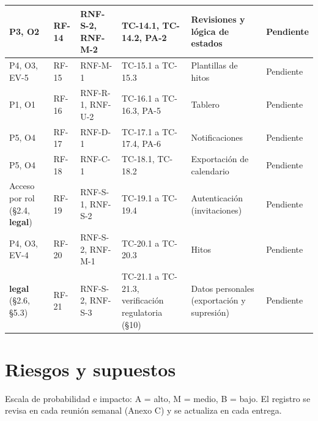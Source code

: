 \documentclass[10pt,a4paper]{article}
\begin{document}
\begin{xltabular}{\linewidth}{|P{2.4cm}|P{1.2cm}|P{2.6cm}|P{2.2cm}|L|P{1.6cm}|}
P3, O2 & RF-14 & RNF-S-2, RNF-M-2 & TC-14.1, TC-14.2, PA-2 & Revisiones y lógica de estados & Pendiente \\ \hline
P4, O3, EV-5 & RF-15 & RNF-M-1 & TC-15.1 a TC-15.3 & Plantillas de hitos & Pendiente \\ \hline
P1, O1 & RF-16 & RNF-R-1, RNF-U-2 & TC-16.1 a TC-16.3, PA-5 & Tablero & Pendiente \\ \hline
P5, O4 & RF-17 & RNF-D-1 & TC-17.1 a TC-17.4, PA-6 & Notificaciones & Pendiente \\ \hline
P5, O4 & RF-18 & RNF-C-1 & TC-18.1, TC-18.2 & Exportación de calendario & Pendiente \\ \hline
Acceso por rol (§2.4, \textbf{legal}) & RF-19 & RNF-S-1, RNF-S-2 & TC-19.1 a TC-19.4 & Autenticación (invitaciones) & Pendiente \\ \hline
P4, O3, EV-4 & RF-20 & RNF-S-2, RNF-M-1 & TC-20.1 a TC-20.3 & Hitos & Pendiente \\ \hline
\textbf{legal} (§2.6, §5.3) & RF-21 & RNF-S-2, RNF-S-3 & TC-21.1 a TC-21.3, verificación regulatoria (§10) & Datos personales (exportación y supresión) & Pendiente \\ \hline
\end{xltabular}

\section{Riesgos y supuestos}
Escala de probabilidad e impacto: A = alto, M = medio, B = bajo. El registro se revisa en cada reunión semanal (Anexo C) y se actualiza en cada entrega.
\end{document}
